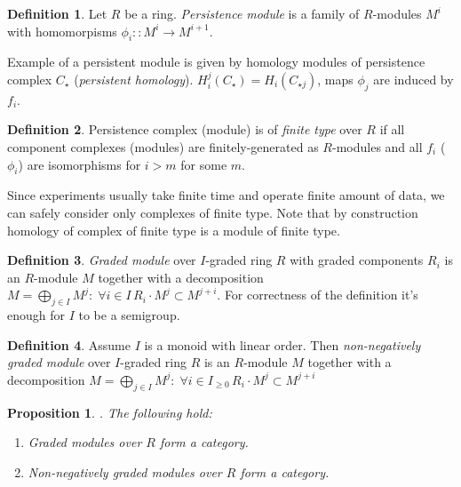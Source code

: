 \documentclass[a4paper, 12pt]{article}
\newtheorem{proposition}{Proposition}
\theoremstyle{definition}
\newtheorem{definition}{Definition}
\theoremstyle{remark}
\newcommand{\define}[1]{{\textit{#1}}}
\begin{document}
\begin{definition}
  Let $R$ be a ring. \define{Persistence module} is a family of $R$-modules $M^i$ with homomorpisms $\phi_i :: M^i \to M^{i+1}$.
\end{definition}

Example of a persistent module is given by homology modules of persistence complex $C_{\star}$ (\define{persistent homology}). $H_i^j(C_{\star}) = H_i(C_{\star{j}})$, maps $\phi_j$ are induced by $f_i$.\\

\begin{definition}
  Persistence complex (module) is of \define{finite type} over $R$ if all component complexes (modules) are finitely-generated as $R$-modules and all $f_i$ ($\phi_i$) are isomorphisms for $i > m$ for some $m$.
\end{definition}

Since experiments usually take finite time and operate finite amount of data, we can safely consider only complexes of finite type. Note that by construction homology of complex of finite type is a module of finite type.\\

\begin{definition}
  \define{Graded module} over $I$-graded ring $R$ with graded components $R_i$ is an $R$-module $M$ together with a decomposition $M = \bigoplus_{j \in I} M^j:\; \forall i \in I\, R_i \cdot M^j \subset M^{j+i}$. For correctness of the definition it's enough for $I$ to be a semigroup.
\end{definition}

\begin{definition}
  Assume $I$ is a monoid with linear order. Then \define{non-negatively graded module} over $I$-graded ring $R$ is an $R$-module $M$ together with a decomposition $M = \bigoplus_{j \in I} M^j:\; \forall i \in I_{\geq 0}\, R_i \cdot M^j \subset M^{j+i}$
\end{definition}

\begin{proposition}. The following hold:
  \begin{enumerate}
    \item Graded modules over $R$ form a category.
    \item Non-negatively graded modules over $R$ form a category.
  \end{enumerate}
\end{proposition}
\end{document}
